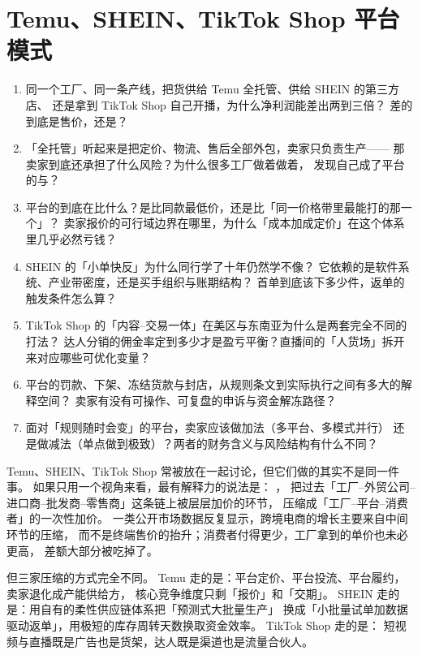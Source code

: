 \chapter{Temu、SHEIN、TikTok Shop 平台模式}
\label{ch:platform}

\begin{insight}[本章要解决的问题]
\begin{enumerate}
  \item 同一个工厂、同一条产线，把货供给 Temu 全托管、供给 SHEIN 的第三方店、
        还是拿到 TikTok Shop 自己开播，为什么净利润能差出两到三倍？
        差的到底是售价，还是？
  \item 「全托管」听起来是把定价、物流、售后全部外包，卖家只负责生产——
        那卖家到底还承担了什么风险？为什么很多工厂做着做着，
        发现自己成了平台的与？
  \item 平台的到底在比什么？是比同款最低价，还是比「同一价格带里最能打的那一个」？
        卖家报价的可行域边界在哪里，为什么「成本加成定价」在这个体系里几乎必然亏钱？
  \item SHEIN 的「小单快反」为什么同行学了十年仍然学不像？
        它依赖的是软件系统、产业带密度，还是买手组织与账期结构？
        首单到底该下多少件，返单的触发条件怎么算？
  \item TikTok Shop 的「内容--交易一体」在美区与东南亚为什么是两套完全不同的打法？
        达人分销的佣金率定到多少才是盈亏平衡？直播间的「人货场」拆开来对应哪些可优化变量？
  \item 平台的罚款、下架、冻结货款与封店，从规则条文到实际执行之间有多大的解释空间？
        卖家有没有可操作、可复盘的申诉与资金解冻路径？
  \item 面对「规则随时会变」的平台，卖家应该做加法（多平台、多模式并行）
        还是做减法（单点做到极致）？两者的财务含义与风险结构有什么不同？
\end{enumerate}
\end{insight}

Temu、SHEIN、TikTok Shop 常被放在一起讨论，但它们做的其实不是同一件事。
如果只用一个视角来看，最有解释力的说法是：
，
把过去「工厂--外贸公司--进口商--批发商--零售商」这条链上被层层加价的环节，
压缩成「工厂--平台--消费者」的一次性加价。
\cite{statista_ecommerce} 一类公开市场数据反复显示，跨境电商的增长主要来自中间环节的压缩，
而不是终端售价的抬升；消费者付得更少，工厂拿到的单价也未必更高，
差额大部分被吃掉了。

但三家压缩的方式完全不同。
Temu 走的是：平台定价、平台投流、平台履约，卖家退化成产能供给方，
核心竞争维度只剩「报价」和「交期」。
SHEIN 走的是：用自有的柔性供应链体系把「预测式大批量生产」
换成「小批量试单加数据驱动返单」，用极短的库存周转天数换取资金效率。
TikTok Shop 走的是：
短视频与直播既是广告也是货架，达人既是渠道也是流量合伙人。

